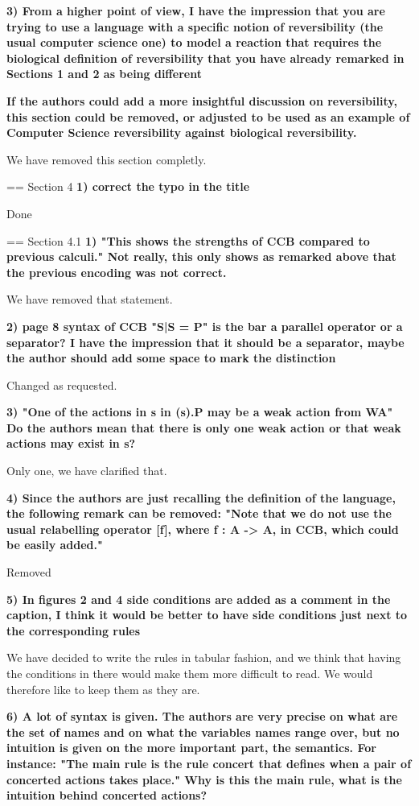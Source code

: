 \documentclass{article}
\begin{document}
\textbf{3) From a higher point of view, I have the impression that you are trying to use a language with a specific notion of reversibility (the usual computer science one) to model a reaction that requires the biological definition of reversibility that you have already remarked in Sections 1 and 2 as being different}

\textbf{If the authors could add a more insightful discussion on reversibility, this section could be removed, or adjusted to be used as an example of Computer Science reversibility against biological reversibility.}

We have removed this section completly.

== Section 4
\textbf{1) correct the typo in the title}

Done

== Section 4.1
\textbf{1) "This shows the strengths of CCB compared to previous calculi."
Not really, this only shows as remarked above that the previous encoding was not correct.}

We have removed that statement.

\textbf{2) page 8 syntax of CCB "S|S = P" is the bar a parallel operator or a separator? 
I have the impression that it should be a separator, maybe the author should add some space to mark the distinction}

Changed as requested.

\textbf{3) "One of the actions in s in (s).P may be a weak action from WA" Do the authors mean that there is only one weak action or that weak actions may exist in s?}

Only one, we have clarified that.

\textbf{4) Since the authors are just recalling the definition of the language, the following remark can be removed:
"Note that we do not use the usual relabelling operator [f], where f : A -> A, in CCB, which could be easily added."}

Removed

\textbf{5) In figures 2 and 4 side conditions are added as a comment in the caption, I think it would be better to have side conditions just next to the corresponding rules}

We have decided to write the rules in tabular fashion, and we think that having the conditions in there would make them more difficult to read. We would therefore like to keep them as they are.

\textbf{6) A lot of syntax is given.  The authors are very precise on what are the set of names and on what the variables names range over, but no intuition is given on the more important part, the semantics.
For instance: "The main rule is the rule concert that defines when a pair of concerted actions takes place." Why is this the main rule, what is the intuition behind concerted actions?}
\end{document}
